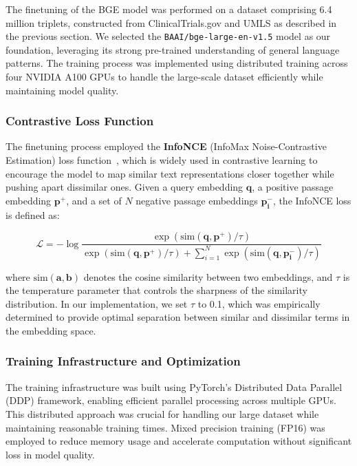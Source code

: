 The finetuning of the BGE model was performed on a dataset comprising 6.4 million triplets, constructed from ClinicalTrials.gov and UMLS as described in the previous section. We selected the \texttt{BAAI/bge-large-en-v1.5} model as our foundation, leveraging its strong pre-trained understanding of general language patterns. The training process was implemented using distributed training across four NVIDIA A100 GPUs to handle the large-scale dataset efficiently while maintaining model quality.

\subsubsection{Contrastive Loss Function}

The finetuning process employed the \textbf{InfoNCE} (InfoMax Noise-Contrastive Estimation) loss function~\cite{oord2018representation}, which is widely used in contrastive learning to encourage the model to map similar text representations closer together while pushing apart dissimilar ones. Given a query embedding $\mathbf{q}$, a positive passage embedding $\mathbf{p^+}$, and a set of $N$ negative passage embeddings $\mathbf{p^-_i}$, the InfoNCE loss is defined as:

\begin{equation}
    \mathcal{L} = - \log \frac{\exp(\text{sim}(\mathbf{q}, \mathbf{p^+}) / \tau)}
    {\exp(\text{sim}(\mathbf{q}, \mathbf{p^+}) / \tau) + \sum_{i=1}^{N} \exp(\text{sim}(\mathbf{q}, \mathbf{p^-_i}) / \tau)}
\end{equation}

where $\text{sim}(\mathbf{a}, \mathbf{b})$ denotes the cosine similarity between two embeddings, and $\tau$ is the temperature parameter that controls the sharpness of the similarity distribution. In our implementation, we set $\tau$ to 0.1, which was empirically determined to provide optimal separation between similar and dissimilar terms in the embedding space.

\subsubsection{Training Infrastructure and Optimization}

The training infrastructure was built using PyTorch's Distributed Data Parallel (DDP) framework, enabling efficient parallel processing across multiple GPUs. This distributed approach was crucial for handling our large dataset while maintaining reasonable training times. Mixed precision training (FP16) was employed to reduce memory usage and accelerate computation without significant loss in model quality.

